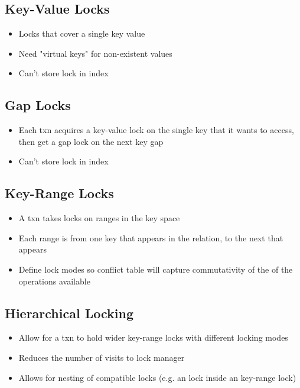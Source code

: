 \documentclass[11pt]{article}
\begin{document}
\subsection*{\textbf{Key-Value Locks}}
    \begin{itemize}
        \item Locks that cover a single key value
        \item Need "virtual keys" for non-existent values
        \item Can't store lock in index
    \end{itemize}

\subsection*{\textbf{Gap Locks}}
    \begin{itemize}
        \item Each txn acquires a key-value lock on the single key that it wants to access, then get a gap lock on the next key gap
        \item Can't store lock in index
    \end{itemize}

\subsection*{\textbf{Key-Range Locks}}
    \begin{itemize}
        \item A txn takes locks on ranges in the key space
        \item Each range is from one key that appears in the relation, to the next that appears
        \item Define lock modes so conflict table will capture commutativity of the of the operations available
    \end{itemize}
\subsection*{\textbf{Hierarchical Locking}}
    \begin{itemize}
        \item Allow for a txn to hold wider key-range locks with different locking modes
        \item Reduces the number of visits to lock manager
        \item Allows for nesting of compatible locks (e.g. an  lock inside an  key-range lock)
    \end{itemize}


\newpage


\end{document}
